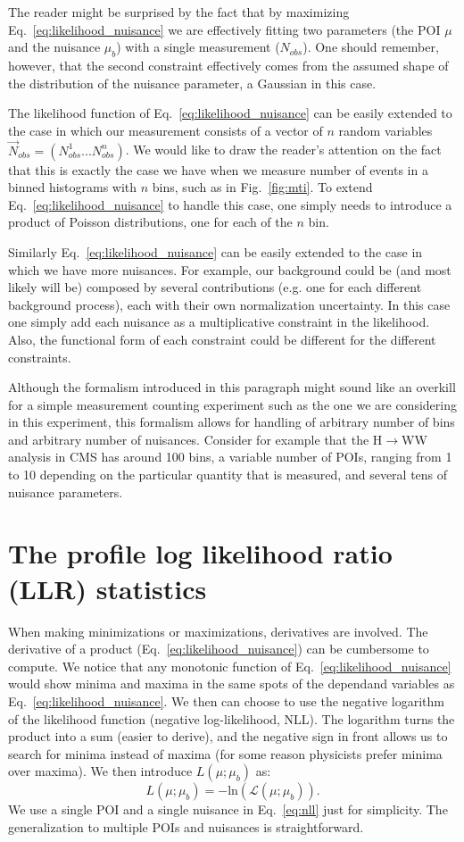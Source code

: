 \documentclass[a4paper,12pt]{article}
\begin{document}
The reader might be surprised by the fact that by maximizing
Eq.~\ref{eq:likelihood_nuisance} we are effectively fitting two parameters
(the POI $\mu$ and the nuisance $\mu_b$) with a single measurement
($N_{obs}$). One should remember, however, that the second constraint effectively comes from the assumed shape of
the distribution of the nuisance parameter, a Gaussian in this case.

The likelihood function of Eq.~\ref{eq:likelihood_nuisance} can be easily
extended to the case in which our measurement consists of a vector of
$n$ random variables $\vec{N}_{obs}=(N_{obs}^1...N_{obs}^n)$. We would like to draw the
reader's attention on the fact that this is exactly the case we have when we measure number
of events in a binned histograms with $n$ bins, such as in
Fig.~\ref{fig:mti}. To extend Eq.~\ref{eq:likelihood_nuisance} to handle this
case, one simply needs to introduce a product of Poisson distributions, one
for each of the $n$ bin. 

Similarly Eq.~\ref{eq:likelihood_nuisance} can be easily
extended to the case in which we have more nuisances. For example, our
background could be (and most likely will be) composed by several contributions (e.g. one for each different
background process), each with their own normalization uncertainty. In this case one simply add each nuisance as a
multiplicative constraint in the likelihood. Also, the functional form of each constraint could
be different for the different constraints.

Although the formalism introduced in this paragraph might sound like an
overkill for a simple measurement counting experiment such as the one we are
considering in this experiment, this formalism allows for handling of
arbitrary number of bins and arbitrary number of nuisances. Consider for
example that the H$\rightarrow{}$WW analysis in CMS has around 100 bins, a  variable number of
POIs, ranging from 1 to 10 depending on the particular quantity that is
measured, and
several tens of nuisance parameters.

\section{The profile log likelihood ratio (LLR) statistics}
When making minimizations or maximizations, derivatives are involved. The derivative of a
product (Eq.~\ref{eq:likelihood_nuisance}) can be cumbersome to compute.
We notice that any monotonic function of Eq.~\ref{eq:likelihood_nuisance} would show
minima and maxima in the same spots of the dependand variables as Eq.~\ref{eq:likelihood_nuisance}. We then can
choose to use the negative logarithm of  the likelihood function (negative
log-likelihood, NLL). The logarithm turns the product into a sum (easier to
derive), and the
negative sign in front allows us to search for minima instead of maxima (for
some reason physicists prefer minima over maxima). We then introduce
$L(\mu;\mu_b)$ as:
\begin{equation}
L(\mu;\mu_b)=-\mathrm{ln}(\mathcal{L}(\mu;\mu_b)).
\label{eq:nll}
\end{equation}
We use a single POI and a single nuisance in Eq.~\ref{eq:nll} just for
simplicity. The generalization to multiple POIs and nuisances is
straightforward.
\end{document}
